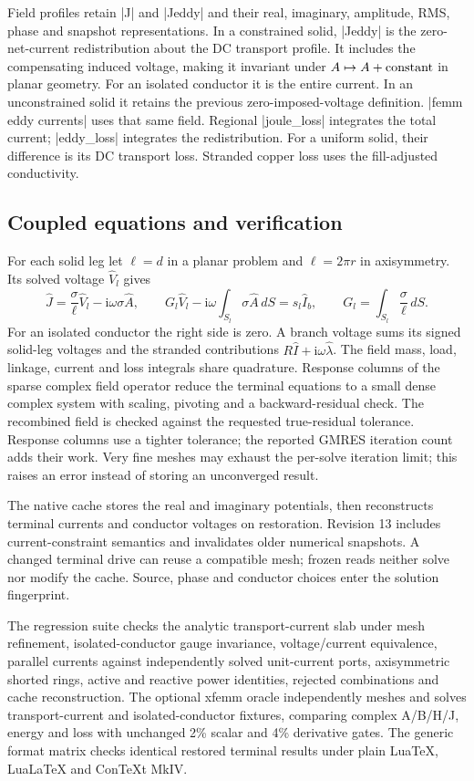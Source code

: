 Field profiles retain |J| and |Jeddy| and their real, imaginary, amplitude,
RMS, phase and snapshot representations. In a constrained solid,
|Jeddy| is the zero-net-current redistribution about the DC transport profile.
It includes the compensating induced voltage, making it invariant under
$A\mapsto A+\hbox{constant}$ in planar geometry. For an isolated conductor it
is the entire current. In an unconstrained solid it retains the previous
zero-imposed-voltage definition. |femm eddy currents| uses that same field.
Regional |joule_loss| integrates the total current; |eddy_loss| integrates the
redistribution. For a uniform solid, their difference is its DC transport
loss. Stranded copper loss uses the fill-adjusted conductivity.

\subsection{Coupled equations and verification}
For each solid leg let $\ell=d$ in a planar problem and $\ell=2\pi r$ in
axisymmetry. Its solved voltage $\widehat V_l$ gives
\[
 \widehat J=\frac{\sigma}{\ell}\widehat V_l
                 -\mathrm i\omega\sigma\widehat A,\qquad
 G_l\widehat V_l-\mathrm i\omega\int_{S_l}\sigma\widehat A\,dS
       =s_l\widehat I_b,\qquad
 G_l=\int_{S_l}\frac{\sigma}{\ell}\,dS.
\]
For an isolated conductor the right side is zero. A branch voltage sums its
signed solid-leg voltages and the stranded contributions
$R\widehat I+\mathrm i\omega\widehat\lambda$. The field mass, load, linkage,
current and loss integrals share quadrature. Response columns of the sparse
complex field operator reduce the terminal equations to a small dense complex
system with scaling, pivoting and a backward-residual check. The recombined
field is checked against the requested true-residual tolerance. Response columns
use a tighter tolerance; the reported GMRES iteration count adds their work.
Very fine meshes may exhaust the per-solve iteration limit; this raises an error
instead of storing an unconverged result.

The native cache stores the real and imaginary potentials, then reconstructs
terminal currents and conductor voltages on restoration. Revision 13 includes
current-constraint semantics and invalidates older numerical snapshots. A
changed terminal drive can reuse a compatible mesh; frozen reads neither solve
nor modify the cache. Source, phase and conductor choices enter the solution
fingerprint.

The regression suite checks the analytic transport-current slab under mesh
refinement, isolated-conductor gauge invariance, voltage/current equivalence,
parallel currents against independently solved unit-current ports, axisymmetric
shorted rings, active and reactive power identities, rejected combinations and
cache reconstruction. The optional xfemm oracle independently meshes and solves
transport-current and isolated-conductor fixtures, comparing complex A/B/H/J,
energy and loss with unchanged 2\% scalar and 4\% derivative gates. The generic format matrix checks identical restored
terminal results under plain LuaTeX, LuaLaTeX and ConTeXt MkIV.

